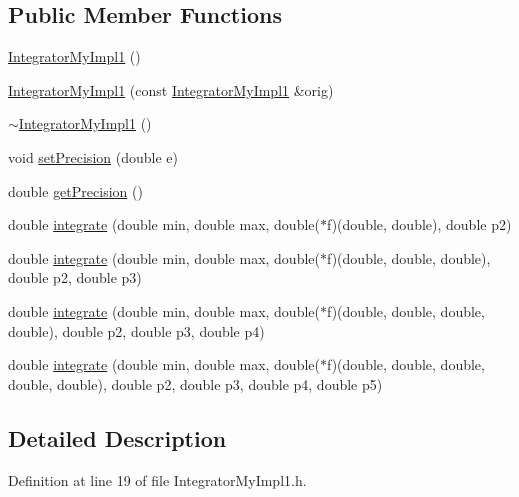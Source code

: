 \subsection*{Public Member Functions}
\begin{DoxyCompactItemize}
\item 
\hyperlink{class_integrator_my_impl1_a1d1b8df78549b530f99b88d6a83e85b0}{Integrator\-My\-Impl1} ()
\item 
\hyperlink{class_integrator_my_impl1_a1cf39ec6d11720cc9965a0b04495080b}{Integrator\-My\-Impl1} (const \hyperlink{class_integrator_my_impl1}{Integrator\-My\-Impl1} \&orig)
\item 
\hyperlink{class_integrator_my_impl1_a483165ecb54e8cf6c43e2972f0ab07b4}{$\sim$\-Integrator\-My\-Impl1} ()
\item 
void \hyperlink{class_integrator_my_impl1_a74ca07f81a587332dab9aee756063c43}{set\-Precision} (double e)
\item 
double \hyperlink{class_integrator_my_impl1_aea9d2dd973771048d4468af0ff8ec0d7}{get\-Precision} ()
\item 
double \hyperlink{class_integrator_my_impl1_a0f5f36cb45c4d50832b1d9bc8bdfcf8b}{integrate} (double min, double max, double($\ast$f)(double, double), double p2)
\item 
double \hyperlink{class_integrator_my_impl1_a841ac12407f9c2941d37e753c3916236}{integrate} (double min, double max, double($\ast$f)(double, double, double), double p2, double p3)
\item 
double \hyperlink{class_integrator_my_impl1_a9bf5693a1c2eff13b04a54771bd4c9df}{integrate} (double min, double max, double($\ast$f)(double, double, double, double), double p2, double p3, double p4)
\item 
double \hyperlink{class_integrator_my_impl1_a5cff324672903d41acb47f852d1a5918}{integrate} (double min, double max, double($\ast$f)(double, double, double, double, double), double p2, double p3, double p4, double p5)
\end{DoxyCompactItemize}


\subsection{Detailed Description}


Definition at line 19 of file Integrator\-My\-Impl1.\-h.



